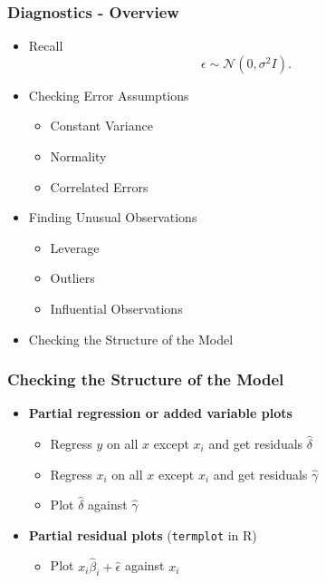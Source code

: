 \documentclass[serif,mathserif,professionalfont]{beamer}
\begin{document}
\begin{frame}
	
	\frametitle{Diagnostics - Overview}
	
	\begin{itemize}
		\item Recall
		$$ \epsilon \sim \mathcal{N} \left(0, \sigma^2 I \right). $$
		\item Checking Error Assumptions
		\begin{itemize}
			\item Constant Variance
			\item Normality
			\item Correlated Errors
		\end{itemize}
		\item Finding Unusual Observations
		\begin{itemize}
			\item Leverage
			\item Outliers
			\item Influential Observations
		\end{itemize}
		\item Checking the Structure of the Model
	\end{itemize}
	
	
\end{frame}




\begin{frame}
	
	\frametitle{Checking the Structure of the Model}
	
	\begin{itemize}
		\item \textbf{Partial regression or added variable plots}
		\begin{itemize}
			\item Regress $ y $ on all $ x $ except $ x_i $ and get residuals $ \widehat{\delta} $
			\item Regress $ x_i $ on all $ x $ except $ x_i $ and get residuals $ \widehat{\gamma} $
			\item Plot $ \widehat{\delta} $ against $ \widehat{\gamma} $
		\end{itemize}
		\item \textbf{Partial residual plots} (\texttt{termplot} in R)
		\begin{itemize}
			\item Plot $ x_i \widehat{\beta}_i + \widehat{\epsilon} $ against $ x_i $
		\end{itemize}
	\end{itemize}
	
	
	
\end{frame}
\end{document}
